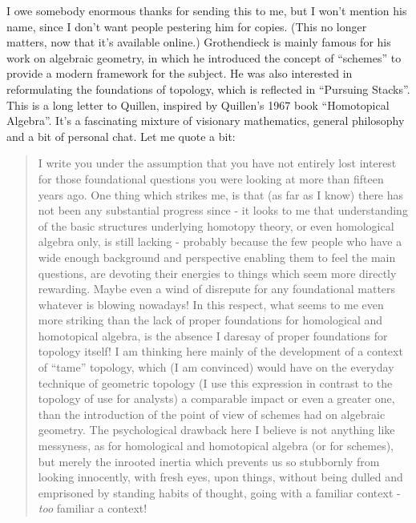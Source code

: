 \documentclass{article}
\def\tightlist{}
\renewcommand{\texttt}[1]{%
  \begingroup
  \ttfamily
  \begingroup\lccode`~=`/\lowercase{\endgroup\def~}{/\discretionary{}{}{}}%
  \begingroup\lccode`~=`[\lowercase{\endgroup\def~}{[\discretionary{}{}{}}%
  \begingroup\lccode`~=`.\lowercase{\endgroup\def~}{.\discretionary{}{}{}}%
  \catcode`/=\active\catcode`[=\active\catcode`.=\active
  \scantokens{#1\noexpand}%
  \endgroup
}
\begin{document}

I owe somebody enormous thanks for sending this to me, but I won't
mention his name, since I don't want people pestering him for copies.
(This no longer matters, now that it's available online.) Grothendieck
is mainly famous for his work on algebraic geometry, in which he
introduced the concept of ``schemes'' to provide a modern framework for
the subject. He was also interested in reformulating the foundations of
topology, which is reflected in ``Pursuing Stacks''. This is a long
letter to Quillen, inspired by Quillen's 1967 book ``Homotopical
Algebra''. It's a fascinating mixture of visionary mathematics, general
philosophy and a bit of personal chat. Let me quote a bit:

\begin{quote}
I write you under the assumption that you have not entirely lost
interest for those foundational questions you were looking at more than
fifteen years ago. One thing which strikes me, is that (as far as I
know) there has not been any substantial progress since - it looks to me
that understanding of the basic structures underlying homotopy theory,
or even homological algebra only, is still lacking - probably because
the few people who have a wide enough background and perspective
enabling them to feel the main questions, are devoting their energies to
things which seem more directly rewarding. Maybe even a wind of
disrepute for any foundational matters whatever is blowing nowadays! In
this respect, what seems to me even more striking than the lack of
proper foundations for homological and homotopical algebra, is the
absence I daresay of proper foundations for topology itself! I am
thinking here mainly of the development of a context of ``tame''
topology, which (I am convinced) would have on the everyday technique of
geometric topology (I use this expression in contrast to the topology of
use for analysts) a comparable impact or even a greater one, than the
introduction of the point of view of schemes had on algebraic geometry.
The psychological drawback here I believe is not anything like
messyness, as for homological and homotopical algebra (or for schemes),
but merely the inrooted inertia which prevents us so stubbornly from
looking innocently, with fresh eyes, upon things, without being dulled
and emprisoned by standing habits of thought, going with a familiar
context - \emph{too} familiar a context!
\end{quote}
\end{document}
